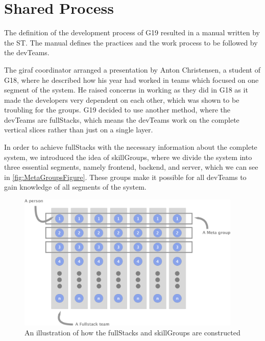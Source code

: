 \section{Shared Process}\label{sec:crossTeam}

The definition of the development process of \gls{G19} resulted in a manual \cite{processManual} written by the \gls{ST}. The manual defines the practices and the work process to be followed by the \glspl{devTeam}.

The \gls{giraf} coordinator arranged a presentation by Anton Christensen, a student of \gls{G18}, where he described how his year had worked in teams which focused on one segment of the system. He raised concerns in working as they did in \gls{G18} as it made the developers very dependent on each other, which was shown to be troubling for the groups. \Gls{G19} decided to use another method, where the \glspl{devTeam} are \glspl{fullStack}, which means the \glspl{devTeam} work on the complete vertical slices rather than just on a single layer.

In order to achieve \glspl{fullStack} with the necessary information about the complete system, we introduced the idea of \glspl{skillGroup}, where we divide the system into three essential segments, namely frontend, backend, and server, which we can see in \autoref{fig:MetaGroupsFigure}. These groups make it possible for all \glspl{devTeam} to gain knowledge of all segments of the system. 

\begin{figure}[H]
        \begin{center}
            \includegraphics[width=0.95\textwidth]{figures/MetaGroupsFigure.pdf}
        \end{center}
        \caption{An illustration of how the \glspl{fullStack} and \glspl{skillGroup} are constructed}
        \label{fig:MetaGroupsFigure}
\end{figure}

